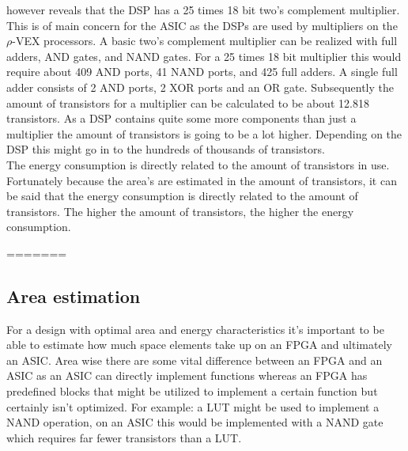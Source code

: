 however reveals that the DSP has a 25 times 18 bit two's complement multiplier. This is of main concern for the ASIC as the DSPs are used by multipliers on the $\rho$-VEX processors. A basic two's complement multiplier can be realized with full adders, AND gates, and NAND gates. For a 25 times 18 bit multiplier this would require about 409 AND ports, 41 NAND ports, and 425 full adders. A single full adder consists of 2 AND ports, 2 XOR ports and an OR gate. Subsequently the amount of transistors for a multiplier can be calculated to be about 12.818 transistors. As a DSP contains quite some more components than just a multiplier the amount of transistors is going to be a lot higher. Depending on the DSP this might go in to the hundreds of thousands of transistors.\\
The energy consumption is directly related to the amount of transistors in use. Fortunately because the area's are estimated in the amount of transistors, it can be said that the energy consumption is directly related to the amount of transistors. The higher the amount of transistors, the higher the energy consumption.

=======
\subsection{Area estimation}
For a design with optimal area and energy characteristics it's important to be able to estimate how much space elements take up on an FPGA and ultimately an ASIC.
Area wise there are some vital difference between an FPGA and an ASIC as an ASIC can directly implement functions whereas an FPGA has predefined blocks that might be utilized to implement a certain function but certainly isn't optimized.
For example: a LUT might be used to implement a NAND operation, on an ASIC this would be implemented with a NAND gate which requires far fewer transistors than a LUT.


